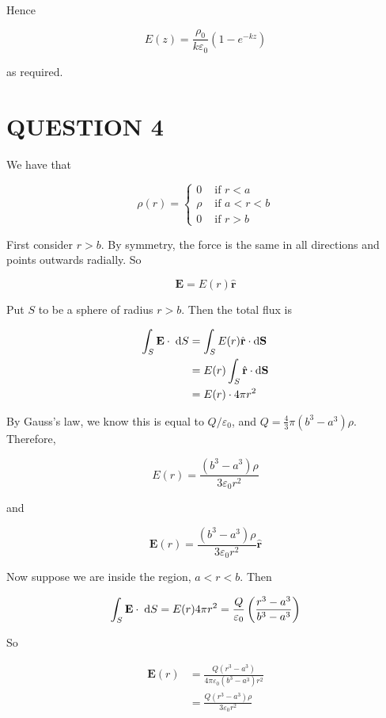 \documentclass[a4paper]{article}
\begin{document}
Hence 

\[ E(z)  =  \frac{\rho_{0}}{k \varepsilon_{0}} (1 - e^{-kz}) \]

as required.




\section{QUESTION 4}

We have that

\[ \rho(r) = \begin{cases} 0  & \text{ if } r < a  \\ \rho & \text{ if } a < r < b \\ 0 & \text{ if } r > b \end{cases} \]


First consider $ r > b $. By symmetry, the force is the same in all directions and points outwards radially. So

\[  \mathbf{E} = E(r) \hat{\mathbf{r}} \]

Put $ S $ to be a sphere of radius $ r > b $. Then the total flux is 

\begin{align*}
\int_{S} \mathbf{E} \cdot \; \mathrm{d} S  & = \int_{S} E(r) \hat{\mathbf{r}} \cdot \mathrm{d} \mathbf{S} \\
& = E(r) \int_{S}  \hat{\mathbf{r}} \cdot \mathrm{d} \mathbf{S} \\
& = E(r) \cdot 4 \pi r^{2}
\end{align*}

By Gauss's law, we know this is equal to $ Q/\varepsilon_{0} $, and $ Q = \frac{4}{3} \pi (b^{3} - a^{3}) \rho $. Therefore,

\[ E(r) = \frac{ (b^{3} - a^{3}) \rho}{3\varepsilon_{0}r^{2}} \]

and

\[  \mathbf{E}(r) = \frac{ (b^{3} - a^{3})\rho}{3\varepsilon_{0}r^{2}} \hat{\mathbf{r}}  \]


Now suppose we are inside the region, $ a < r < b $. Then


\[ \int_{S} \mathbf{E} \cdot \; \mathrm{d} S = E(r) 4 \pi r^{2} = \frac{Q}{\varepsilon_{0}} \left(  \frac{r^{3}-a^{3}}{b^{3}-a^{3}} \right)  \]

So 

\begin{align*}
\mathbf{E}(r) & = \frac{Q(r^{3}-a^{3})}{4 \pi \varepsilon_{0}(b^{3}-a^{3}) r^{2}} \\
& = \frac{Q(r^{3}-a^{3})\rho}{3 \varepsilon_{0} r^{2}}
\end{align*}
\end{document}
